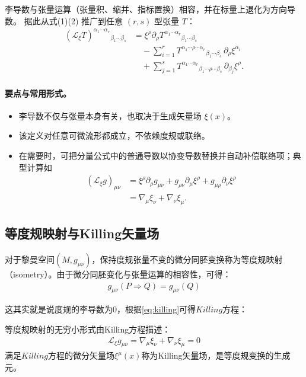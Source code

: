 \begin{derivationnote}[一般张量的李导数]
李导数与张量运算（张量积、缩并、指标置换）相容，并在标量上退化为方向导数。
据此从式(1)(2) 推广到任意 $(r,s)$ 型张量 $T$：
\begin{align}
(\mathcal{L}_\xi T)^{\alpha_1\cdots\alpha_r}{}_{\beta_1\cdots\beta_s}
&= \xi^\rho\partial_\rho T^{\alpha_1\cdots\alpha_r}{}_{\beta_1\cdots\beta_s} \nonumber\\
&\quad-\sum_{i=1}^{r} T^{\alpha_1\cdots\rho\cdots\alpha_r}{}_{\beta_1\cdots\beta_s}\,\partial_\rho\xi^{\alpha_i} \nonumber\\
&\quad+\sum_{j=1}^{s} T^{\alpha_1\cdots\alpha_r}{}_{\beta_1\cdots\rho\cdots\beta_s}\,\partial_{\beta_j}\xi^{\rho}.
\tag{3}
\end{align}
\end{derivationnote}

\paragraph{要点与常用形式。}
\begin{itemize}
  \item 李导数不仅与张量本身有关，也取决于生成矢量场 $\xi(x)$。
  \item 该定义对任意可微流形都成立，不依赖度规或联络。
  \item 在需要时，可把分量公式中的普通导数以协变导数替换并自动补偿联络项；典型计算如
  \begin{align}
  (\mathcal{L}_\xi g)_{\mu\nu}
  &= \xi^\rho\partial_\rho g_{\mu\nu}
  + g_{\rho\nu}\partial_\mu\xi^\rho
  + g_{\mu\rho}\partial_\nu\xi^\rho \nonumber\\
  &= \nabla_\mu\xi_\nu+\nabla_\nu\xi_\mu . \label{eq:killing}
  \end{align}
\end{itemize}

\subsection{等度规映射与Killing矢量场}

\begin{definition}[等度规映射]
对于黎曼空间$(M,g_{\mu\nu})$，保持度规张量不变的微分同胚变换称为等度规映射（isometry）。由于微分同胚变化与张量运算的相容性，可得：
\begin{align}
g_{\mu\nu}(P \Rightarrow Q) = g_{\mu\nu}(Q)
\end{align}
\end{definition}
这其实就是说度规的李导数为0，根据\ref{eq:killing}可得$Killing$方程：
\begin{theorem}[Killing方程]
等度规映射的无穷小形式由Killing方程描述：
\begin{align}
\mathcal{L}_\xi g_{\mu\nu} = \nabla_\mu\xi_\nu+\nabla_\nu\xi_\mu = 0
\end{align}
满足$Killing$方程的微分矢量场$\xi^\mu(x)$称为Killing矢量场，是等度规变换的生成元。
\end{theorem}

